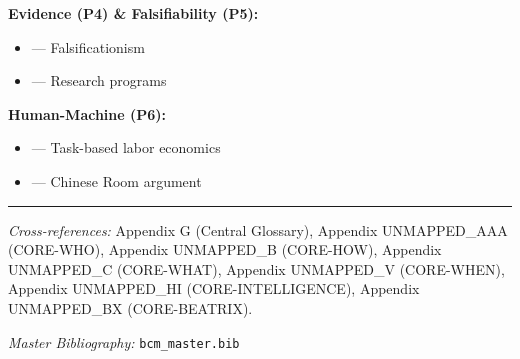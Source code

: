 \textbf{Evidence (P4) \& Falsifiability (P5):}
\begin{itemize}[nosep]
    \item \citet{popper1959logic} --- Falsificationism
    \item \citet{lakatos1978methodology} --- Research programs
\end{itemize}

\textbf{Human-Machine (P6):}
\begin{itemize}[nosep]
    \item \citet{autor2003skill} --- Task-based labor economics
    \item \citet{searle1980minds} --- Chinese Room argument
\end{itemize}

\nocite{bcm_master}



\vspace{1em}
\hrule
\vspace{0.5em}

\noindent\textit{Cross-references:}
Appendix G (Central Glossary),
Appendix UNMAPPED_AAA (CORE-WHO),
Appendix UNMAPPED_B (CORE-HOW),
Appendix UNMAPPED_C (CORE-WHAT),
Appendix UNMAPPED_V (CORE-WHEN),
Appendix UNMAPPED_HI (CORE-INTELLIGENCE),
Appendix UNMAPPED_BX (CORE-BEATRIX).

\noindent\textit{Master Bibliography:} \texttt{bcm\_master.bib}


